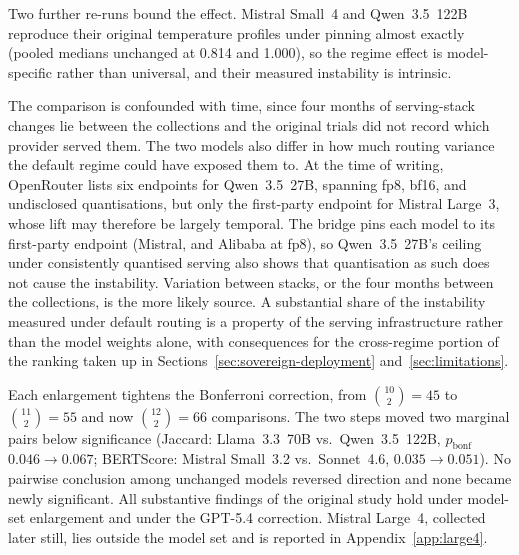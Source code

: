 Two further re-runs bound the effect. Mistral Small~4 and Qwen~3.5~122B reproduce their original temperature profiles under pinning almost exactly (pooled medians unchanged at 0.814 and 1.000), so the regime effect is model-specific rather than universal, and their measured instability is intrinsic.

The comparison is confounded with time, since four months of serving-stack changes lie between the collections and the original trials did not record which provider served them. The two models also differ in how much routing variance the default regime could have exposed them to. At the time of writing, OpenRouter lists six endpoints for Qwen~3.5~27B, spanning fp8, bf16, and undisclosed quantisations, but only the first-party endpoint for Mistral Large~3, whose lift may therefore be largely temporal. The bridge pins each model to its first-party endpoint (Mistral, and Alibaba at fp8), so Qwen~3.5~27B's ceiling under consistently quantised serving also shows that quantisation as such does not cause the instability. Variation between stacks, or the four months between the collections, is the more likely source. A substantial share of the instability measured under default routing is a property of the serving infrastructure rather than the model weights alone, with consequences for the cross-regime portion of the ranking taken up in Sections~\ref{sec:sovereign-deployment} and~\ref{sec:limitations}.

Each enlargement tightens the Bonferroni correction, from $\binom{10}{2}=45$ to $\binom{11}{2}=55$ and now $\binom{12}{2}=66$ comparisons. The two steps moved two marginal pairs below significance (Jaccard: Llama~3.3~70B vs.\ Qwen~3.5~122B, $p_{\text{bonf}}$ $0.046 \to 0.067$; BERTScore: Mistral Small~3.2 vs.\ Sonnet~4.6, $0.035 \to 0.051$). No pairwise conclusion among unchanged models reversed direction and none became newly significant. All substantive findings of the original study hold under model-set enlargement and under the GPT-5.4 correction. Mistral Large~4, collected later still, lies outside the model set and is reported in Appendix~\ref{app:large4}.
